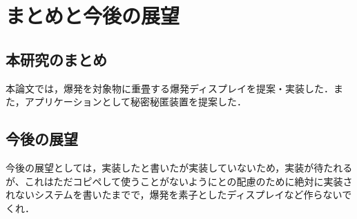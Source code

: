 \chapter{まとめと今後の展望}
\label{chap:conclusion}

\section{本研究のまとめ}

本論文では，爆発を対象物に重畳する爆発ディスプレイを提案・実装した．また，アプリケーションとして秘密秘匿装置を提案した．

\section{今後の展望}

今後の展望としては，実装したと書いたが実装していないため，実装が待たれるが、これはただコピペして使うことがないようにとの配慮のために絶対に実装されないシステムを書いたまでで，爆発を素子としたディスプレイなど作らないでくれ．